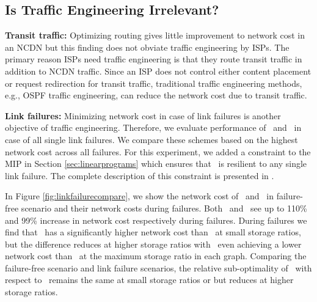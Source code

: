 \eat
{

\subsection{Is Traffic Engineering Irrelevant?}

\textbf{Transit traffic:} Optimizing routing gives little improvement to network cost in an NCDN but this finding does not obviate traffic engineering by ISPs.  The primary reason ISPs need traffic engineering is that they route transit traffic in addition to NCDN traffic. Since an ISP does not control either content placement or request redirection for transit traffic, traditional traffic engineering methods, e.g., OSPF traffic engineering, can reduce the network cost due to transit traffic.

\textbf{Link failures:} Minimizing network cost in case of link failures is another objective of traffic engineering. Therefore, we evaluate performance of \invlru\ and \optrpfuture\  in case of all single link failures. We compare these schemes based on the highest network cost across all failures. For this experiment, we added a constraint to the MIP in Section \ref{sec:linearprograms} which ensures that \optrpfuture\ is resilient to any single link failure. The complete description of this constraint is presented in \cite{techreport}.


In Figure  \ref{fig:linkfailurecompare}, we show the network cost of \invlru\ and \optrpfuture\ in failure-free scenario and their network costs during failures. Both \invlru\ and \optrpfuture\ see up to 110\% and 99\% increase in network cost  respectively during failures. During failures we find that \invlru\  has a significantly higher network cost than \optrpfuture\  at small storage ratios, but the difference reduces at higher storage ratios with \invlru\ even achieving a lower network cost than \optrpfuture\ at the maximum storage ratio in each graph.  Comparing the failure-free scenario and link failure scenarios, the relative sub-optimality of \invlru\ with respect to \optrpfuture\ remains the same at small storage ratios or but reduces at higher storage ratios. 

}
